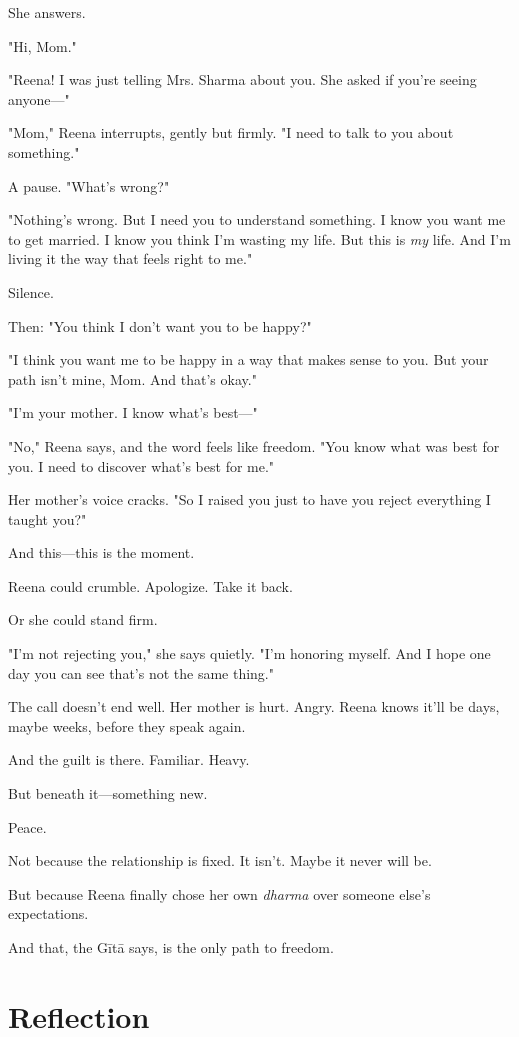 \documentclass[11pt,twoside]{book}
\begin{document}
She answers.

"Hi, Mom."

"Reena! I was just telling Mrs. Sharma about you. She asked if you're seeing anyone—"

"Mom," Reena interrupts, gently but firmly. "I need to talk to you about something."

A pause. "What's wrong?"

"Nothing's wrong. But I need you to understand something. I know you want me to get married. I know you think I'm wasting my life. But this is \emph{my} life. And I'm living it the way that feels right to me."

Silence.

Then: "You think I don't want you to be happy?"

"I think you want me to be happy in a way that makes sense to you. But your path isn't mine, Mom. And that's okay."

"I'm your mother. I know what's best—"

"No," Reena says, and the word feels like freedom. "You know what was best for you. I need to discover what's best for me."

Her mother's voice cracks. "So I raised you just to have you reject everything I taught you?"

And this—this is the moment.

Reena could crumble. Apologize. Take it back.

Or she could stand firm.

"I'm not rejecting you," she says quietly. "I'm honoring myself. And I hope one day you can see that's not the same thing."

The call doesn't end well. Her mother is hurt. Angry. Reena knows it'll be days, maybe weeks, before they speak again.

And the guilt is there. Familiar. Heavy.

But beneath it—something new.

Peace.

Not because the relationship is fixed. It isn't. Maybe it never will be.

But because Reena finally chose her own \emph{dharma} over someone else's expectations.

And that, the Gītā says, is the only path to freedom.

\section*{Reflection}
\end{document}
